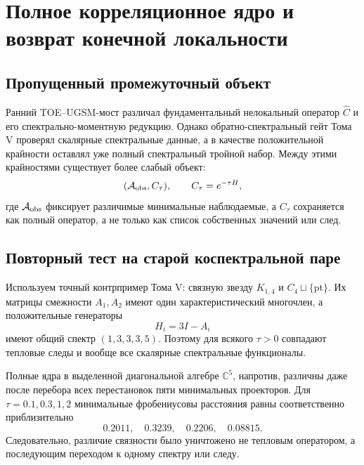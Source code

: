 \chapter{Полное корреляционное ядро и возврат конечной локальности}
\label{ch:v8-full-correlation-kernel-locality-reconstruction-gate}

\section{Пропущенный промежуточный объект}

Ранний TOE--UGSM-мост различал фундаментальный нелокальный оператор
$\widehat C$ и его спектрально-моментную редукцию. Однако обратно-спектральный
гейт Тома V проверял скалярные спектральные данные, а в качестве
положительной крайности оставлял уже полный спектральный тройной набор.
Между этими крайностями существует более слабый объект:
\begin{equation}
 (\mathcal A_{\rm obs},C_\tau),
 \qquad C_\tau=e^{-\tau H},
 \label{eq:v8-full-kernel-object}
\end{equation}
где $\mathcal A_{\rm obs}$ фиксирует различимые минимальные наблюдаемые, а
$C_\tau$ сохраняется как полный оператор, а не только как список
собственных значений или след.

\section{Повторный тест на старой коспектральной паре}

Используем точный контрпример Тома V: связную звезду $K_{1,4}$ и
$C_4\sqcup\{\mathrm{pt}\}$. Их матрицы смежности $A_1,A_2$ имеют один
характеристический многочлен, а положительные генераторы
\begin{equation}
 H_i=3I-A_i
\end{equation}
имеют общий спектр $(1,3,3,3,5)$. Поэтому для всякого $\tau>0$
совпадают тепловые следы и вообще все скалярные спектральные функционалы.

Полные ядра в выделенной диагональной алгебре $\mathbb C^5$, напротив,
различны даже после перебора всех перестановок пяти минимальных проекторов.
Для $\tau=0.1,0.3,1,2$ минимальные фробениусовы расстояния равны
соответственно приблизительно
\begin{equation}
 0.2011,\quad 0.3239,\quad 0.2206,\quad 0.08815.
\end{equation}
Следовательно, различие связности было уничтожено не тепловым оператором,
а последующим переходом к одному спектру или следу.

